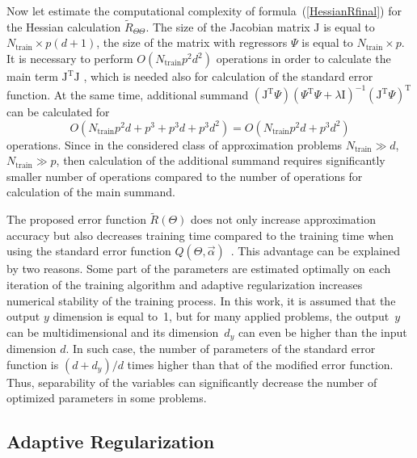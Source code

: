 \begin{multicols}{2}
\medskip

Now let estimate the computational complexity of formula~(\ref{HessianRfinal}) 
for the Hessian calculation $\widetilde R_{\Theta\Theta}$.
The size of the Jacobian matrix
 $\mathrm{J}$ is equal to $N_{\mathrm{train}} \times p(d+1)$, the size of 
 the matrix with regressors $\Psi$ is equal to $N_{\mathrm{train}} \times p$.
It is necessary to perform $O(N_{\mathrm{train}}p^2d^2)$ operations in order 
to calculate the main term $\mathrm{J}^{\mathrm{T}}\mathrm{J}$ , 
which is needed also for calculation of the standard error function.
At the same time, additional summand
 $\left(\mathrm{J}^{\mathrm{T}}  \Psi\right)
    \left( \Psi^{\mathrm{T}} \Psi + \lambda \mathrm{I}\right)^{-1} \left( 
    \mathrm{J}^{\mathrm{T}}  \Psi\right)^{\mathrm{T}}$ can be calculated for 
    $$
    O(N_{\mathrm{train}} p^2 d + p^3 + p^3d + p^3d^2) = O(N_{\mathrm{train}} p^2 d + p^3d^2)
    $$ 
    operations. Since in the considered class of approximation problems
$N_{\mathrm{train}} \gg d$, $N_{\mathrm{train}} \gg p$, then calculation 
of the additional summand requires significantly smaller number of operations 
compared to the number of operations for calculation of the main summand.

The proposed error function $\widetilde R\left( \Theta \right)$ does not only 
increase approximation accuracy but also decreases training time 
compared to the training time when using the standard error function
 $Q\left( \Theta, \vec \alpha \right)$~\cite{itas11_Belyaev}.
This advantage can be explained by two reasons. Some part of the parameters 
are estimated optimally on each iteration of the training algorithm and adaptive 
regularization increases numerical stability of the training process. In this work,
it is assumed that the output $y$ dimension is equal to~1, but for many applied problems, 
the output~$y$ can be multidimensional and its dimension~$d_y$ can even be higher 
than the input dimension $d$. In such case, the number of parameters of the standard 
error function is $({d+d_y})/{d}$ times higher than that of the modified error function.
Thus, separability of the variables can significantly decrease the number of optimized 
parameters in some problems.
{ %

}

\subsection{Adaptive Regularization}
\label{regularization}


\end{multicols}
